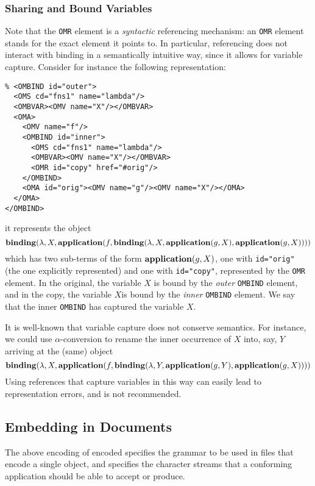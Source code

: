 \subsubsection{Sharing and Bound Variables}\label{sec_sharing_bvars}

Note that the \lstinline|OMR| element is a \emph{syntactic} referencing mechanism: an
\lstinline|OMR| element stands for the exact \XML element it points to. In particular,
referencing does not interact with binding in a semantically intuitive way, since it
allows for variable capture. Consider for instance the following \XML representation:
\begin{lstlisting}
% <OMBIND id="outer">
  <OMS cd="fns1" name="lambda"/>
  <OMBVAR><OMV name="X"/></OMBVAR>
  <OMA>
    <OMV name="f"/>
    <OMBIND id="inner">
      <OMS cd="fns1" name="lambda"/>
      <OMBVAR><OMV name="X"/></OMBVAR>
      <OMR id="copy" href="#orig"/>
    </OMBIND>
    <OMA id="orig"><OMV name="g"/><OMV name="X"/></OMA>
  </OMA>
</OMBIND>
\end{lstlisting}
it represents the \OM object
\[\mathbf{binding}(\lambda,X,\mathbf{application}(f,\mathbf{binding}(\lambda,X,\mathbf{application}(g,X),\mathbf{application}(g,X))))\]
which has two sub-terms of the form $\mathbf{application}(g,X)$, one with \lstinline|id="orig"|
(the one explicitly represented) and one with \lstinline|id="copy"|, represented by the
\lstinline|OMR| element. In the original, the variable $X$ is bound by the \emph{outer}
\lstinline|OMBIND| element, and in the copy, the variable $X$is bound by the \emph{inner}
\lstinline|OMBIND| element. We say that the inner \lstinline|OMBIND| has captured the
variable $X$.

It is well-known that variable capture does not conserve semantics. For instance, we could
use $\alpha$-conversion to rename the inner occurrence of $X$ into, say, $Y$ arriving at
the (same) object
\[\mathbf{binding}(\lambda,X,\mathbf{application}(f,\mathbf{binding}(\lambda,Y,\mathbf{application}(g,Y),\mathbf{application}(g,X))))\]
Using references that capture variables in this way can easily lead to representation
errors, and is not recommended.

\subsection{Embedding \OM in \XML Documents}\label{xmldoc}
     
The above encoding of \XML encoded \OM specifies the grammar to be used in files that
encode a single \OM object, and specifies the character streams that a conforming \OM
application should be able to accept or produce.


